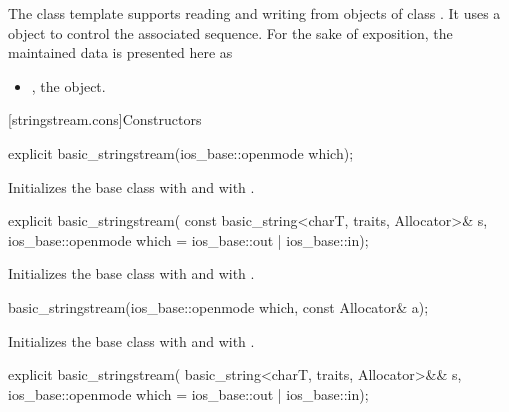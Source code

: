 \pnum
The
class template
supports reading and writing from objects of class
.
It uses a
object to control the associated sequence.
For the sake of exposition, the maintained data is presented here as
\begin{itemize}
\item
{}, the  object.
\end{itemize}

[stringstream.cons]{Constructors}

%
\begin{itemdecl}
explicit basic_stringstream(ios_base::openmode which);
\end{itemdecl}

\begin{itemdescr}
\pnum
\effects
Initializes the base class with
and
with
.
\end{itemdescr}

%
\begin{itemdecl}
explicit basic_stringstream(
  const basic_string<charT, traits, Allocator>& s,
  ios_base::openmode which = ios_base::out | ios_base::in);
\end{itemdecl}

\begin{itemdescr}
\pnum
\effects
Initializes the base class with
and
with
.
\end{itemdescr}

%
\begin{itemdecl}
basic_stringstream(ios_base::openmode which, const Allocator& a);
\end{itemdecl}

\begin{itemdescr}
\pnum
\effects
Initializes the base class with
and  with
.
\end{itemdescr}

%
\begin{itemdecl}
explicit basic_stringstream(
  basic_string<charT, traits, Allocator>&& s,
  ios_base::openmode which = ios_base::out | ios_base::in);
\end{itemdecl}

